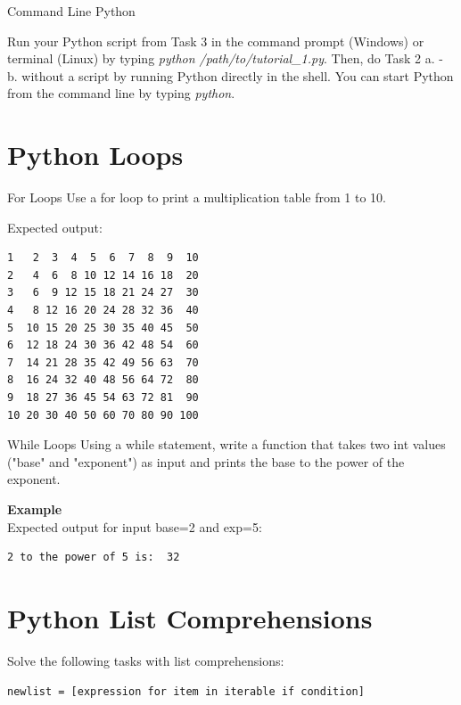 \documentclass[twoside]{article}
\begin{document}
\begin{task}{Command Line Python}{}{}

    Run your Python script from Task 3 in the command prompt (Windows) or terminal (Linux) by typing \textit{python /path/to/tutorial\_1.py}.
    Then, do Task 2 a. - b. without a script by running Python directly in the shell.
    You can start Python from the command line by typing \textit{python}.

\end{task}


\newpage
\section{Python Loops}
\begin{task}{For Loops}{}{}
Use a for loop to print a multiplication table from 1 to 10.

\vspace{10pt}
Expected output:
\begin{lstlisting}[numbers=none]
1   2  3  4  5  6  7  8  9  10 		
2   4  6  8 10 12 14 16 18  20 		
3   6  9 12 15 18 21 24 27  30 		
4   8 12 16 20 24 28 32 36  40 		
5  10 15 20 25 30 35 40 45  50 		
6  12 18 24 30 36 42 48 54  60 		
7  14 21 28 35 42 49 56 63  70 		
8  16 24 32 40 48 56 64 72  80 		
9  18 27 36 45 54 63 72 81  90 		
10 20 30 40 50 60 70 80 90 100 
\end{lstlisting}

\end{task}

\begin{task}{While Loops}{}{}
Using a while statement, write a function that takes two int values ("base" and "exponent") as input and prints the base to the power of the exponent.

\vspace{10pt}
\textbf{Example}\\
Expected output for input base=2 and exp=5:
\begin{lstlisting}[numbers=none]
2 to the power of 5 is:  32
\end{lstlisting}

\end{task}


\clearpage
\newpage
\section{Python List Comprehensions}

Solve the following tasks with list comprehensions:
\begin{lstlisting}[numbers=none]
newlist = [expression for item in iterable if condition] 
\end{lstlisting}
\end{document}
